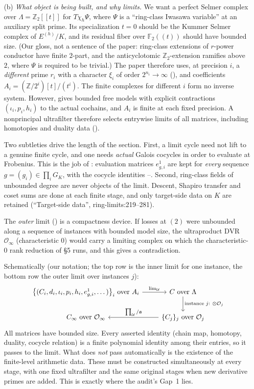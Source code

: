 \documentclass[11pt]{article}
\theoremstyle{remark}
\newcommand{\Z}{\mathbb Z}
\newcommand{\F}{\mathbb F}
\newcommand{\cO}{\mathcal O}
\newcommand{\src}[2]{\textsf{\small #1:#2}}
\begin{document}
(b) \emph{What object is being built, and why limits.} We want a perfect
Selmer complex over $\Lambda=\Z_2[[t]]$ for $T\chi_h\Psi$, where $\Psi$ is a
``ring-class Iwasawa variable'' at an auxiliary split prime. Its specialization
$t=0$ should be the Kummer Selmer complex of $E^{(h)}/K$, and its residual
fiber over $\F_2((t))$ should have bounded size. (Our gloss, not a sentence of the paper: ring-class
extensions of $r$-power conductor have finite $2$-part, and the
anticyclotomic $\Z_2$-extension ramifies above $2$, where $\Psi$ is required
to be trivial.) The paper therefore uses,
at precision $i$, a \emph{different} prime $r_i$ with a character $\xi_i$
of order $2^{n_i}\to\infty$ (), and coefficients
$A_i=(\Z/2^i)[t]/(t^i)$. The finite complexes for different $i$ form no
inverse system. However,  gives bounded free models with
explicit contractions $(\iota_i,p_i,h_i)$ to the actual cochains, and
$A_i$ is finite at each fixed precision. A nonprincipal ultrafilter therefore
selects entrywise limits of all matrices, including homotopies and duality
data ().

Two subtleties drive the length of the section. First, a limit cycle
need not lift to a genuine finite cycle, and one needs \emph{actual} Galois
cocycles in order to evaluate at Frobenius. This is the job of
: evaluation matrices $e^1_{g,i}$ are kept for
\emph{every} sequence $g=(g_i)\in\prod_iG_K$, with the cocycle identities
--. Second, ring-class fields of
unbounded degree are never objects of the limit. Descent, Shapiro transfer
and coset sums are done at each finite stage, and only target-side data on
$K$ are retained (``Target-side data'', \src{ring-limits}{219--281}).

The \emph{outer} limit () is a compactness device.
If losses at $(2)$ were unbounded along a sequence of instances with
bounded model size, the ultraproduct DVR $\cO_\infty$ (characteristic $0$)
would carry a limiting complex on which the characteristic-$0$ rank
reduction of \S5 runs, and this gives a contradiction.

Schematically (our notation; the top row is the inner limit for one
instance, the bottom row the outer limit over instances $j$):
\[
\begin{tikzcd}[column sep=2.4em,row sep=1.8em]
\bigl\{(C_i,d_i,\iota_i,p_i,h_i,e^1_{g,i},\dots)\bigr\}_i\ \text{over } A_i
 \arrow[r,"\lim_{\mathcal U}"] &
 C\ \text{over }\Lambda \arrow[d,"{\text{instance } j:\ \otimes\cO_j}"]\\
C_\infty\ \text{over }\cO_\infty &
 \{C_j\}_j\ \text{over }\cO_j \arrow[l,"\prod_{\mathcal U}/\mathfrak a"']
\end{tikzcd}
\]
All matrices have bounded size. Every asserted identity (chain map,
homotopy, duality, cocycle relation) is a finite polynomial identity among
their entries, so it passes to the limit. What does \emph{not} pass
automatically is the existence of the finite-level arithmetic data. These
must be constructed simultaneously at every stage, with one fixed ultrafilter
and the same original stages when new derivative primes are added. This is
exactly where the audit's Gap~1 lies.
\end{document}
